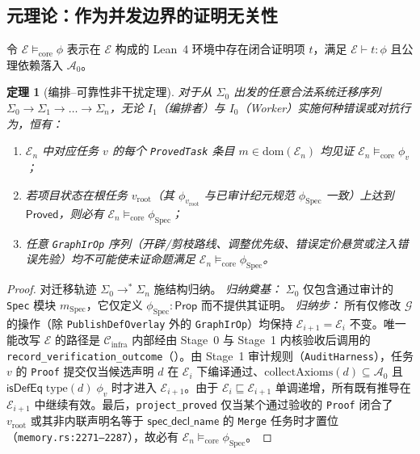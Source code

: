 \documentclass[10pt,a4paper,fontset=fandol]{ctexart}
\newtheorem{theorem}{定理}[section]
\newcommand{\Cinfra}{\mathcal{C}_{\mathrm{infra}}}
\newcommand{\Truth}{\mathcal{E}}
\newcommand{\Orch}{\mathcal{G}}
\newcommand{\Spec}{\mathrm{Spec}}
\newcommand{\Prop}{\mathsf{Prop}}
\newcommand{\AxiomsZero}{\mathcal{A}_0}
\newcommand{\kw}[1]{\mathsf{#1}}
\newcommand{\code}[1]{\texttt{#1}}
\begin{document}
\subsection{元理论：作为并发边界的证明无关性}

令 $\Truth \models_{\mathrm{core}} \phi$ 表示在 $\Truth$ 构成的 Lean~4 环境中存在闭合证明项 $t$，满足 $\Truth \vdash t : \phi$ 且公理依赖落入 $\AxiomsZero$。

\begin{theorem}[编排--可靠性非干扰定理]\label{thm:non-interference}
对于从 $\Sigma_0$ 出发的任意合法系统迁移序列 $\Sigma_0 \to \Sigma_1 \to \dots \to \Sigma_n$，无论 $I_1$（编排者）与 $I_0$（Worker）实施何种错误或对抗行为，恒有：
\begin{enumerate}
  \item $\Truth_n$ 中对应任务 $v$ 的每个 \code{ProvedTask} 条目 $m \in \mathrm{dom}(\Truth_n)$ 均见证 $\Truth_n \models_{\mathrm{core}} \phi_v$；
  \item 若项目状态在根任务 $v_{\mathrm{root}}$（其 $\phi_{v_{\mathrm{root}}}$ 与已审计纪元规范 $\phi_{\Spec}$ 一致）上达到 $\kw{Proved}$，则必有 $\Truth_n \models_{\mathrm{core}} \phi_{\Spec}$；
  \item 任意 \code{GraphIrOp} 序列（开辟/剪枝路线、调整优先级、错误定价悬赏或注入错误先验）均不可能使未证命题满足 $\Truth_n \models_{\mathrm{core}} \phi_{\Spec}$。
\end{enumerate}
\end{theorem}

\begin{proof}
对迁移轨迹 $\Sigma_0 \to^* \Sigma_n$ 施结构归纳。
\emph{归纳奠基：} $\Sigma_0$ 仅包含通过审计的 \code{Spec} 模块 $m_{\Spec}$，它仅定义 $\phi_{\Spec} : \Prop$ 而不提供其证明。
\emph{归纳步：} 所有仅修改 $\Orch$ 的操作（除 \code{PublishDefOverlay} 外的 \code{GraphIrOp}）均保持 $\Truth_{i+1} = \Truth_i$ 不变。唯一能改写 $\Truth$ 的路径是 $\Cinfra$ 内部经由 Stage~0 与 Stage~1 内核验收后调用的 \code{record\_verification\_outcome}（）。由 Stage~1 审计规则（\code{AuditHarness}），任务 $v$ 的 \code{Proof} 提交仅当候选声明 $d$ 在 $\Truth_i$ 下编译通过、$\mathrm{collectAxioms}(d) \subseteq \AxiomsZero$ 且 $\kw{isDefEq}\;\mathrm{type}(d)\;\phi_v$ 时才进入 $\Truth_{i+1}$。由于 $\Truth_i \sqsubseteq \Truth_{i+1}$ 单调递增，所有既有推导在 $\Truth_{i+1}$ 中继续有效。最后，\code{project\_proved} 仅当某个通过验收的 \code{Proof} 闭合了 $v_{\mathrm{root}}$ 或其非内联声明名等于 $\kw{spec\_decl\_name}$ 的 \code{Merge} 任务时才置位（\code{memory.rs:2271--2287}），故必有 $\Truth_n \models_{\mathrm{core}} \phi_{\Spec}$。
\end{proof}
\end{document}
